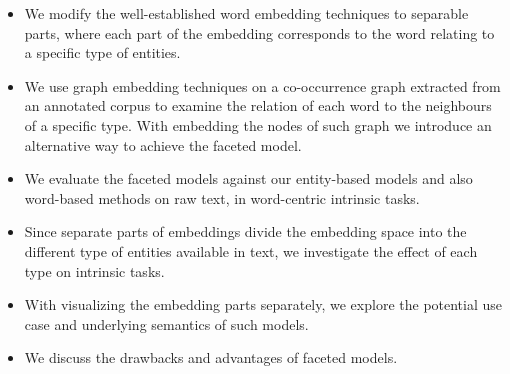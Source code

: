\begin{itemize}
\item We modify the well-established word embedding techniques to separable parts, where each part of the embedding corresponds to the word relating to a specific type of entities. 
\item We use graph embedding techniques on a co-occurrence graph extracted from an annotated corpus to examine the relation of each word to the neighbours of a specific type. With embedding the nodes of such graph we introduce an alternative way to achieve the faceted model. 
\item We evaluate the faceted models against our entity-based models and also word-based methods on raw text, in word-centric intrinsic tasks. 
\item Since separate parts of embeddings divide the embedding space into the different type of entities available in text, we investigate the effect of each type on intrinsic tasks. 
\item With visualizing the embedding parts separately, we explore the potential use case and underlying semantics of such models. 
\item We discuss the drawbacks and advantages of faceted models. 
  
\end{itemize}



